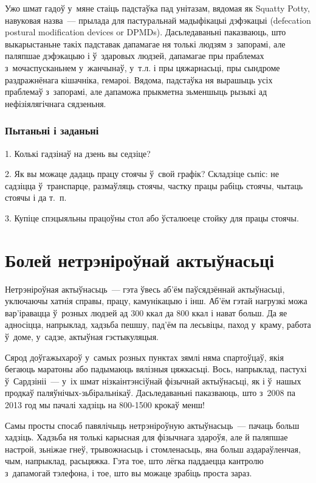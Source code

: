 Ужо шмат гадоў у~мяне стаіць падстаўка пад унітазам, вядомая як Squatty Potty, навуковая назва~--- прылада для пастуральнай мадыфікацыі дэфэкацыі (defecation postural modification devices or DPMDs). Дасьледаваньні паказваюць, што выкарыстаньне такіх падставак дапамагае ня толькі людзям з~запорамі, але паляпшае дэфэкацыю і ў~здаровых людзей, дапамагае пры праблемах з~мочаспусканьнем у~жанчынаў, у~т.л. і пры цяжарнасьці, пры сындроме раздражнёнага кішачніка, гемароі. Вядома, падстаўка ня вырашыць усіх праблемаў з~запорамі, але дапаможа прыкметна зьменшыць рызыкі ад нефізіялягічнага сядзеньня.

\subsubsection{Пытаньні і заданьні}

1. Колькі гадзінаў на дзень вы седзіце?

2. Як вы можаце дадаць працу стоячы ў~свой графік? Складзіце сьпіс: не садзіцца ў~транспарце, размаўляць стоячы, частку працы рабіць стоячы, чытаць стоячы і да т.~п.

3. Купіце спэцыяльны працоўны стол або ўсталюеце стойку для працы стоячы.


\section{Болей нетрэніроўнай актыўнасьці}

Нетрэніроўная актыўнасьць~--- гэта ўвесь аб'ём паўсядзённай актыўнасьці, уключаючы хатнія справы, працу, камунікацыю і інш. Аб'ём гэтай нагрузкі можа вар'іравацца ў~розных людзей ад 300 ккал да 800 ккал і нават больш. Да яе адносіцца, напрыклад, хадзьба пешшу, пад'ём па лесьвіцы, паход у~краму, работа ў~доме, у~садзе, актыўная гэстыкуляцыя.

Сярод доўгажыхароў у~самых розных пунктах зямлі няма спартоўцаў, якія бегаюць маратоны або падымаюць вялізныя цяжкасьці. Вось, напрыклад, пастухі ў~Сардзініі~--- у~іх шмат нізкаінтэнсіўнай фізычнай актыўнасьці, як і ў~нашых продкаў паляўнічых-зьбіральнікаў. Дасьледаваньні паказваюць, што з~2008 па 2013 год мы пачалі хадзіць на 800-1500 крокаў менш!

Самы просты спосаб павялічыць нетрэніроўную актыўнасьць~--- пачаць больш хадзіць. Хадзьба ня толькі карысная для фізычнага здароўя, але й паляпшае настрой, зьніжае гнеў, трывожнасьць і стомленасьць, яна больш аздараўленчая, чым, напрыклад, расьцяжка. Гэта тое, што лёгка паддаецца кантролю з~дапамогай тэлефона, і тое, што вы можаце зрабіць проста зараз.

